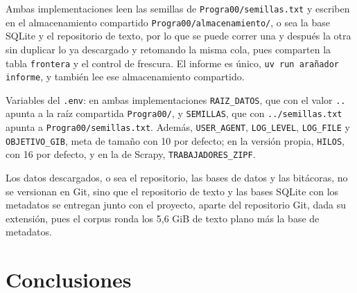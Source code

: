 \documentclass[11pt,spanish]{article}
\begin{document}
Ambas implementaciones leen las semillas de \texttt{Progra00/semillas.txt} y escriben en el almacenamiento compartido \texttt{Progra00/almacenamiento/}, o sea la base SQLite y el repositorio de texto, por lo que se puede correr una y después la otra sin duplicar lo ya descargado y retomando la misma cola, pues comparten la tabla \texttt{frontera} y el control de frescura. El informe es único, \texttt{uv run arañador informe}, y también lee ese almacenamiento compartido.

Variables del \texttt{.env}: en ambas implementaciones \texttt{RAIZ\_DATOS}, que con el valor \texttt{..} apunta a la raíz compartida \texttt{Progra00/}, y \texttt{SEMILLAS}, que con \texttt{../semillas.txt} apunta a \texttt{Progra00/semillas.txt}. Además, \texttt{USER\_AGENT}, \texttt{LOG\_LEVEL}, \texttt{LOG\_FILE} y \texttt{OBJETIVO\_GIB}, meta de tamaño con 10 por defecto; en la versión propia, \texttt{HILOS}, con 16 por defecto, y en la de Scrapy, \texttt{TRABAJADORES\_ZIPF}.

Los datos descargados, o sea el repositorio, las bases de datos y las bitácoras, no se versionan en Git, sino que el repositorio de texto y las bases SQLite con los metadatos se entregan junto con el proyecto, aparte del repositorio Git, dada su extensión, pues el corpus ronda los 5,6 GiB de texto plano más la base de metadatos.

\section{Conclusiones}
\end{document}
